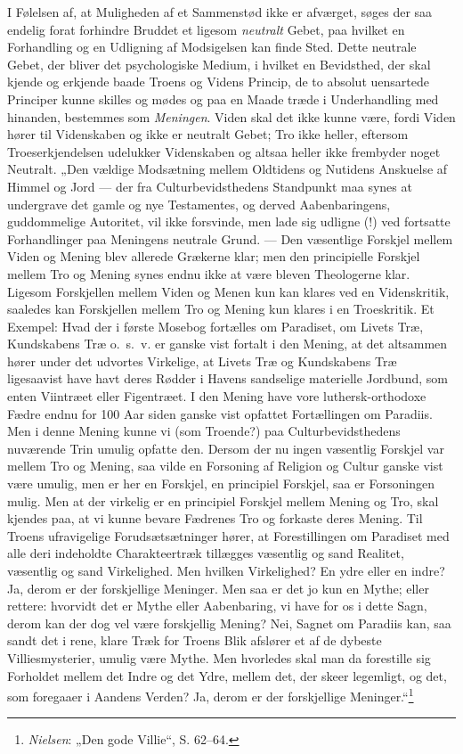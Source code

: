\documentclass[12pt,a4paper]{book}
\newcommand{\opage}[1]{\marginnote{\footnotesize\textit{[#1]}}}
\begin{document}
I Følelsen af, at Muligheden af et Sammenstød ikke er afværget, søges der saa endelig forat
forhindre Bruddet et ligesom \emph{neutralt} Gebet, paa hvilket en Forhandling og en Udligning
af Modsigelsen kan finde Sted. Dette neutrale Gebet, der bliver det psychologiske Medium, i
hvilket en Bevidsthed, der skal kjende og erkjende baade Troens og Videns Princip, de to
absolut uensartede Principer kunne skilles og mødes og paa en Maade træde i Underhandling med
hinanden, bestemmes som \emph{Meningen}. Viden skal det ikke kunne være, fordi Viden hører til
Videnskaben og ikke er neutralt Gebet; Tro ikke heller, eftersom Troeserkjendelsen udelukker
Videnskaben og altsaa heller ikke frembyder noget Neutralt. „Den vældige Modsætning mellem
Oldtidens og Nutidens Anskuelse af Himmel og Jord --- der fra Culturbevidsthedens Standpunkt
maa synes at undergrave det gamle og nye Testamentes, og derved Aabenbaringens, guddommelige
Autoritet, vil ikke forsvinde, men lade sig udligne (!) ved fortsatte Forhandlinger paa
Meningens neutrale Grund. --- Den væsentlige Forskjel mellem Viden og Mening blev allerede
Grækerne klar; men den principielle Forskjel mellem Tro og Mening synes endnu ikke at være
bleven Theologerne klar. Ligesom Forskjellen mellem Viden og Menen kun kan klares ved en
Videnskritik, saaledes kan Forskjellen mellem Tro og Mening kun klares i en Troeskritik. Et
Exempel: Hvad der i første Mosebog fortælles om Paradiset, om Livets Træ, Kundskabens Træ
o.\ s.\ v. er ganske vist fortalt i den Mening, at det altsammen hører under det udvortes
Virkelige, at Livets Træ og Kundskabens Træ ligesaavist have havt deres Rødder i Havens
sandselige \opage{190}materielle Jordbund, som enten Viintræet eller Figentræet. I den Mening have vore
luthersk-orthodoxe Fædre endnu for 100 Aar siden ganske vist opfattet Fortællingen om Paradiis.
Men i denne Mening kunne vi (som Troende?) paa Culturbevidsthedens nuværende Trin umulig opfatte
den. Dersom der nu ingen væsentlig Forskjel var mellem Tro og Mening, saa vilde en Forsoning af
Religion og Cultur ganske vist være umulig, men er her en Forskjel, en principiel Forskjel, saa
er Forsoningen mulig. Men at der virkelig er en principiel Forskjel mellem Mening og Tro, skal
kjendes paa, at vi kunne bevare Fædrenes Tro og forkaste deres Mening. Til Troens ufravigelige
Forudsætsætninger hører, at Forestillingen om Paradiset med alle deri indeholdte Charakteertræk
tillægges væsentlig og sand Realitet, væsentlig og sand Virkelighed. Men hvilken Virkelighed?
En ydre eller en indre? Ja, derom er der forskjellige Meninger. Men saa er det jo kun en
Mythe; eller rettere: hvorvidt det er Mythe eller Aabenbaring, vi have for os i dette Sagn,
derom kan der dog vel være forskjellig Mening? Nei, Sagnet om Paradiis kan, saa sandt det i
rene, klare Træk for Troens Blik afslører et af de dybeste Villiesmysterier, umulig være
Mythe. Men hvorledes skal man da forestille sig Forholdet mellem det Indre og det Ydre, mellem
det, der skeer legemligt, og det, som foregaaer i Aandens Verden? Ja, derom er der
forskjellige Meninger.“\footnote{\emph{Nielsen}: „Den gode Villie“, S. 62--64.}
\end{document}
